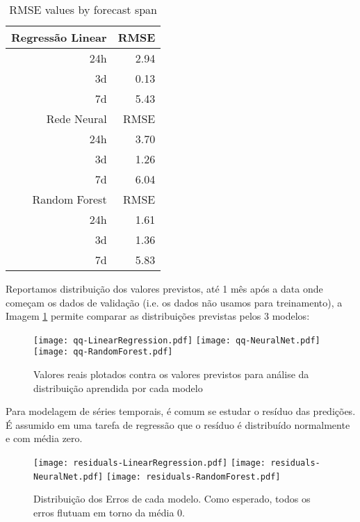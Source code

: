 \begin{center}
\begin{table}[htbp]
\caption{RMSE values by forecast span}
\centering
\begin{tabular}{rr}
\hline
 Regressão Linear & RMSE\\
\hline
24h & 2.94\\
3d & 0.13\\
7d & 5.43\\
\hline
Rede Neural & RMSE\\
\hline
24h & 3.70\\
3d & 1.26\\
7d & 6.04\\
\hline
Random Forest & RMSE\\
\hline
24h & 1.61\\
3d & 1.36\\
7d & 5.83\\
\end{tabular}

\label{tb:rmse_lin}
\end{table}
\end{center}

 Reportamos distribuição dos valores previstos, até 1 mês após a data
onde começam os dados de validação (i.e. os dados não usamos para treinamento), a Imagem \ref{fig:distr_lin} permite comparar as distribuições previstas pelos 3 modelos:

\begin{figure}[H]
\label{fig:distr_lin}
\centering
\texttt{[image: qq-LinearRegression.pdf]} \hfill
\texttt{[image: qq-NeuralNet.pdf]} \hfill
\texttt{[image: qq-RandomForest.pdf]} 
\caption{Valores reais plotados contra os valores previstos para análise da distribuição aprendida por cada modelo} 
\end{figure}

Para modelagem de séries temporais, é comum se estudar o resíduo das
predições. É assumido em uma tarefa de regressão que o resíduo é distribuído
normalmente e com média zero.

\begin{figure}[H]
  \label{fig:res_lin}
  \centering
  \texttt{[image: residuals-LinearRegression.pdf]} \hfill
  \texttt{[image: residuals-NeuralNet.pdf]} \hfill
  \texttt{[image: residuals-RandomForest.pdf]} 
  \caption{Distribuição dos Erros de cada modelo. Como esperado, todos os erros flutuam em torno da média 0. } 
\end{figure}

